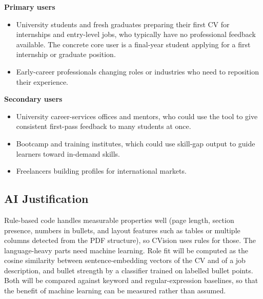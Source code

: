 \documentclass[11pt,a4paper]{article}
\begin{document}
\textbf{Primary users}
\begin{itemize}
  \item University students and fresh graduates preparing their first CV
  for internships and entry-level jobs, who typically have no
  professional feedback available. The concrete core user is a
  final-year student applying for a first internship or graduate
  position.
  \item Early-career professionals changing roles or industries who need
  to reposition their experience.
\end{itemize}

\textbf{Secondary users}
\begin{itemize}
  \item University career-services offices and mentors, who could use
  the tool to give consistent first-pass feedback to many students at
  once.
  \item Bootcamp and training institutes, which could use skill-gap
  output to guide learners toward in-demand skills.
  \item Freelancers building profiles for international markets.
\end{itemize}

\subsection{AI Justification}

Rule-based code handles measurable properties well (page length,
section presence, numbers in bullets, and layout features such as tables
or multiple columns detected from the PDF structure), so CVision uses
rules for those. The language-heavy parts need machine learning. Role
fit will be computed as the cosine similarity between sentence-embedding
vectors of the CV and of a job description, and bullet strength by a
classifier trained on labelled bullet points. Both will be compared
against keyword and regular-expression baselines, so that the benefit of
machine learning can be measured rather than assumed.
\end{document}
